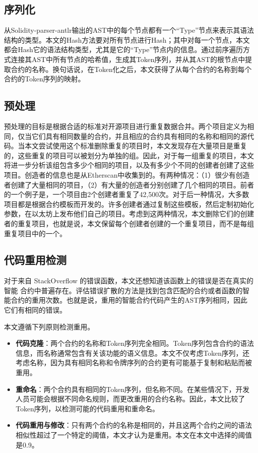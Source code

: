 \subsection{序列化}

从Solidity-parser-antlr输出的AST中的每个节点都有一个“Type”节点来表示其语法结构的类型。本文的Hash方法要对所有节点进行Hash；其中对每一个节点，本文都会Hash它的语法结构类型，尤其是它的“Type”节点内的信息。通过前序遍历方式连接其AST中所有节点的哈希值，生成其Token序列，并从其AST的根节点中提取合约的名称。换句话说，在Token化之后，本文获得了从每个合约的名称到每个合约的Token序列的映射。

\subsection{预处理}

预处理的目标是根据合适的标准对开源项目进行重复数据合并。两个项目定义为相同，仅当它们具有相同数量的合约，并且相应的合约具有相同的名称和相同的源代码。当本文尝试使用这个标准删除重复的项目时，本文发现存在大量项目是重复的，这些重复的项目可以被划分为单独的组。因此，对于每一组重复的项目，本文将进一步分析该组包含多少个相同的项目，以及有多少个不同的创建者创建了这些项目。创造者的信息也是从Etherscan中收集到的。有两种情况：（1）很少有创造者创建了大量相同的项目，（2）有大量的创造者分别创建了几个相同的项目。前者的一个例子是，一个项目由2个创建者重复了42,500次。对于后一种情况，大多数项目都是根据合约模板而开发的。许多创建者通过复制这些模板，然后定制初始化参数，在以太坊上发布他们自己的项目。考虑到这两种情况，本文删除它们的创建者的重复项目，也就是说，本文保留每个创建者创建的一个重复项目，而不是每组重复项目中的一个。

\subsection{代码重用检测}

对于来自 StackOverflow 的错误函数，本文还想知道该函数上的错误是否在真实的智能 合约中普遍存在。评估错误扩散的方法是找到包含匹配的合约或者函数的智能合约的重用次数。也就是说，重用的智能合约代码产生的AST序列相同，因此它们有相同的错误。

本文遵循下列原则检测重用。

\begin{itemize}

    \item \textbf{代码克隆}：两个合约的名称和Token序列完全相同。Token序列包含合约的语法信息，而名称通常包含有关该功能的语义信息。本文不仅考虑Token序列，还考虑名称，因为具有相同名称和令牌序列的合约更有可能基于复制和粘贴而被重用。
    
    \item \textbf{重命名}：两个合约具有相同的Token序列，但名称不同。在某些情况下，开发人员可能会根据不同命名规则，而更改重用的合约名称。因此，本文比较了Token序列，以检测可能的代码重用和重命名。
    
    \item \textbf{代码重用与修改}：只有两个合约的名称是相同的，并且这两个合约之间的语法相似性超过了一个特定的阈值，本文才认为是重用。本文在本文中选择的阈值是0.9。
    
\end{itemize}

